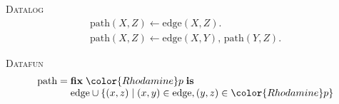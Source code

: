 \documentclass[dvipsnames,fleqn]{beamer}
\providecommand\EMPH\textsc
\newcommand\kw\textbf
\newcommand\name\text
\newcommand\eset[1]{\{{#1}\}}
\newcommand\esetfor[2]{\eset{{#1} \mathrel{|} {#2}}}
\begin{document}


\newcommand\efix[1]{\kw{fix}\;{#1}\;\kw{is}\;}
\newcommand\hilit{\color{Rhodamine}}

\begin{frame}
  \EMPH{Datalog}
  \[
  \begin{array}{l}
    \name{path}(X,Z) \gets \name{edge}(X,Z).\\
    \name{path}(X,Z) \gets \name{edge}(X,Y),\, \name{path}(Y,Z).
  \end{array}
  \]
  \vspace{0pt}

  \EMPH{Datafun}
  \[
  \begin{array}{l}
    \name{path} =
    \efix{\hilit p}\\
    \phantom{\name{path} ={}}
    \name{edge} \cup \esetfor{(x,z)}{(x,y) \in \name{edge}, (y,z) \in \hilit p}
  \end{array}
  \]
  
\end{frame}
\end{document}
